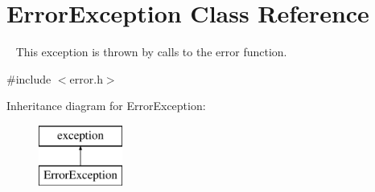 \hypertarget{classErrorException}{}\section{Error\+Exception Class Reference}
\label{classErrorException}


~\newline
 This exception is thrown by calls to the {\ttfamily error} function.  




{\ttfamily \#include $<$error.\+h$>$}

Inheritance diagram for Error\+Exception\+:\begin{figure}[H]
\begin{center}
\leavevmode
\includegraphics[height=2.000000cm]{classErrorException}
\end{center}
\end{figure}
